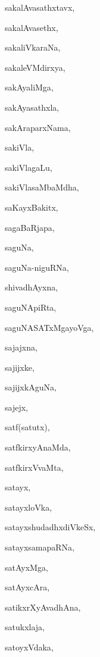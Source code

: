 \begin{multicols}{2}
{sakalAvasathxtavx}, \pageref{sakalAvasathxtavx}

{sakalAvasethx}, \pageref{sakalAvasethx}

{sakaliVkaraNa}, \pageref{sakaliVkaraNa}

{sakaleVMdirxya}, \pageref{sakaleVMdirxya}

{sakAyaliMga}, \pageref{sakAyaliMga}

{sakAyasathxla}, \pageref{sakAyasathxla}

{sakAraparxNama}, \pageref{sakAraparxNama}

{sakiVla}, \pageref{sakiVla}

{sakiVlagaLu}, \pageref{sakiVlagaLu}

{sakiVlasaMbaMdha}, \pageref{sakiVlasaMbaMdha}

{saKayxBakitx}, \pageref{saKayxBakitx}

{sagaBaRjapa}, \pageref{sagaBaRjapa}

{saguNa}, \pageref{saguNa}

{saguNa-niguRNa}, \pageref{saguNa-niguRNa}

{shivadhAyxna}, \pageref{shivadhAyxna}

{saguNApiRta}, \pageref{saguNApiRta}

{saguNASATxMgayoVga}, \pageref{saguNASATxMgayoVga}

{sajajxna}, \pageref{sajajxna}

{sajijxke}, \pageref{sajijxke}

{sajijxkAguNa}, \pageref{sajijxkAguNa}

{sajejx}, \pageref{sajejx}

{satf(satutx)}, \pageref{satfsatutx}

{satfkirxyAnaMda}, \pageref{satfkirxyAnaMda}

{satfkirxVvaMta}, \pageref{satfkirxVvaMta}

{satayx}, \pageref{satayx}

{satayxloVka}, \pageref{satayxloVka}

{satayxshudadhxdiVkeSx}, \pageref{satayxshudadhxdiVkeSx}

{satayxsamapaRNa}, \pageref{satayxsamapaRNa}

{satAyxMga}, \pageref{satAyxMga}

{satAyxcAra}, \pageref{satAyxcAra}

{satikxrXyAvadhAna}, \pageref{satikxrXyAvadhAna}

{satukxlaja}, \pageref{satukxlaja}

{satoyxVdaka}, \pageref{satoyxVdaka}


\end{multicols}
